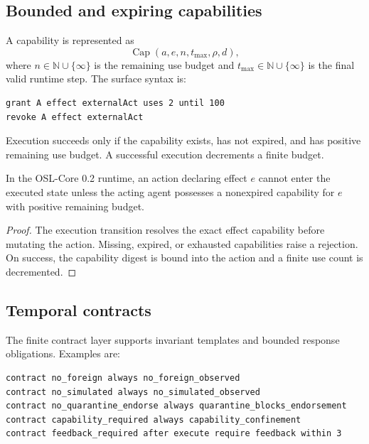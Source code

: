 \subsection{Bounded and expiring capabilities}

A capability is represented as
\[
  \operatorname{Cap}
  (a,e,n,t_{\max},\rho,d),
\]
where $n\in\mathbb N\cup\{\infty\}$ is the remaining use budget and
$t_{\max}\in\mathbb N\cup\{\infty\}$ is the final valid runtime step.  The
surface syntax is:
\begin{lstlisting}[style=osl]
grant A effect externalAct uses 2 until 100
revoke A effect externalAct
\end{lstlisting}
Execution succeeds only if the capability exists, has not expired, and has
positive remaining use budget.  A successful execution decrements a finite
budget.

\begin{proposition}
In the OSL-Core 0.2 runtime, an action declaring effect $e$ cannot enter the
executed state unless the acting agent possesses a nonexpired capability for
$e$ with positive remaining budget.
\end{proposition}

\begin{proof}
The execution transition resolves the exact effect capability before mutating
the action.  Missing, expired, or exhausted capabilities raise a rejection.  On
success, the capability digest is bound into the action and a finite use count
is decremented.
\end{proof}



\subsection{Temporal contracts}

The finite contract layer supports invariant templates and bounded response
obligations.  Examples are:
\begin{lstlisting}[style=osl]
contract no_foreign always no_foreign_observed
contract no_simulated always no_simulated_observed
contract no_quarantine_endorse always quarantine_blocks_endorsement
contract capability_required always capability_confinement
contract feedback_required after execute require feedback within 3
\end{lstlisting}

